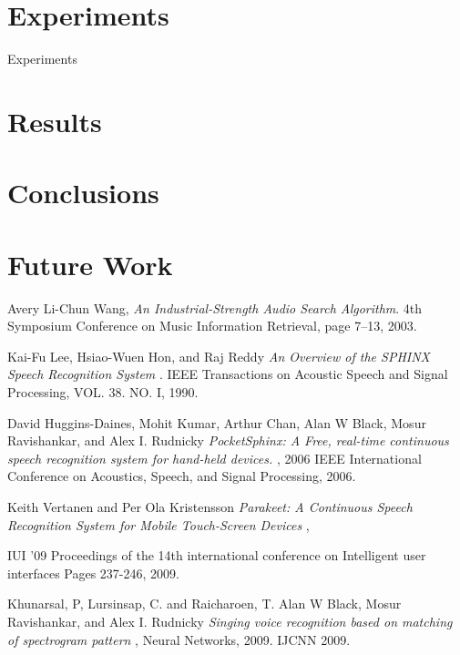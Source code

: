 \documentclass[anon]{CI}
\begin{document}
\section{Experiments}
Experiments

\section{Results}

\section{Conclusions}

\section{Future Work}


\begin{thebibliography}{9}

  Avery Li-Chun Wang,
  \emph{An Industrial-Strength Audio Search Algorithm}.
4th Symposium Conference on Music Information Retrieval, page 7--13,
  2003.

  Kai-Fu Lee, Hsiao-Wuen Hon, and Raj Reddy
  \emph{An Overview of the SPHINX Speech 
Recognition System }.
IEEE Transactions on Acoustic Speech  and Signal Processing, VOL. 38. NO. I, 
  1990.

 David Huggins-Daines, Mohit Kumar, Arthur Chan,
Alan W Black, Mosur Ravishankar, and Alex I. Rudnicky
  \emph{PocketSphinx: A Free, real-time continuous speech recognition system for hand-held devices.
 },
2006 IEEE International Conference on Acoustics, Speech, and Signal Processing,
  2006.

 Keith Vertanen and Per Ola Kristensson 
  \emph{Parakeet: A Continuous Speech Recognition System 
for Mobile Touch-Screen Devices 
 },

IUI '09 Proceedings of the 14th international conference on Intelligent user interfaces
Pages 237-246,
 2009.

 Khunarsal, P, Lursinsap, C.  and Raicharoen, T.
Alan W Black, Mosur Ravishankar, and Alex I. Rudnicky
  \emph{Singing voice recognition based on matching of spectrogram pattern }, Neural Networks, 2009. IJCNN 2009.
\end{thebibliography}
\end{document}
